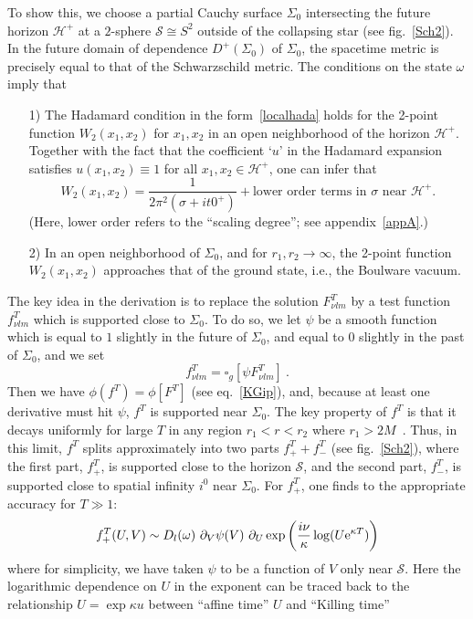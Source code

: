 \documentclass[12pt]{article}
\renewcommand{\H}{\mathcal{H}}
\newcommand{\e}{{\rm e}}
\theoremstyle{plain}
\theoremstyle{definition}
\def\ben{\begin{equation}}
\def\een{\end{equation}}
\begin{document}
To show this, we choose a partial Cauchy surface $\Sigma_0$
intersecting the future horizon $\H^+$ at a $2$-sphere ${\mathscr S} \cong S^2$ outside of the collapsing star (see
fig.~\ref{Sch2}). In the future
domain of dependence $D^+(\Sigma_0)$ of $\Sigma_0$,
the spacetime metric is precisely equal to that of
the Schwarzschild metric. The conditions on the state $\omega$ imply that
\begin{enumerate}
\item[1)] The Hadamard condition in the form~\eqref{localhada} holds for the 2-point function
$W_2(x_1,x_2)$ for $x_1,x_2$ in an open neighborhood of the horizon $\H^+$. Together with the fact that the
coefficient `$u$' in the Hadamard expansion satisfies $u(x_1,x_2) \equiv 1$ for all $x_1,x_2 \in \H^+$, one can infer that
\ben\label{hadamf}
W_2(x_1, x_2)  = \frac{1}{2\pi^2 (\sigma + it0^+)} + \text{lower order terms in $\sigma$ near $\H^+$.}
\een
(Here, lower order refers to the ``scaling degree''; see appendix~\ref{appA}.)

\item[2)] In an open neighborhood of $\Sigma_0$, and for $r_1, r_2 \to \infty$, the
2-point function $W_2(x_1,x_2)$ approaches that of the ground state, i.e., the Boulware vacuum.
\end{enumerate}
The key idea in the derivation
is to replace the solution $F^T_{\nu lm}$ by a test function $f^T_{\nu lm}$
which is supported close to $\Sigma_0$. To do so, we let
$\psi$ be a smooth function which
is equal to $1$ slightly in the future of $\Sigma_0$, and equal to $0$ slightly in the
past of $\Sigma_0$, and we set
\ben
f^T_{\nu lm} = \square_g [\psi F^T_{\nu lm} ] \ .
\een
Then we have $\phi(f^T) = \phi[F^T]$ (see eq.~\eqref{KGip}), and, because at least one derivative must hit $\psi$, $f^T$ is supported near $\Sigma_0$. 
The key property of $f^T$ is that it decays uniformly for large $T$ in any region $r_1 < r < r_2$ where $r_1 > 2M$~\cite{dafermos}.
Thus, in this limit, $f^T$ splits approximately into two parts $f_+^T+f_-^T$ (see fig.~\ref{Sch2}), where the first part, $f_+^T$, is supported close to the horizon $\mathscr S$, and the
second part, $f_-^T$, is supported close to spatial infinity $i^0$ near $\Sigma_0$.
For $f_+^T$, one finds to the appropriate accuracy
for $T \gg 1$:
\ben\label{Fp}
f^T_+(U,V) \sim  D_l(\omega) \ \partial_V
\psi(V)
 \ \partial_U \exp\left( \frac{i\nu}{\kappa} \log(U\e^{\kappa T}) \right)
\een
where for simplicity, we have taken $\psi$ to be a function of $V$ only near $\mathscr S$. Here the logarithmic
dependence on $U$ in the exponent can be traced back to the relationship $U = \exp{\kappa u}$ between ``affine time'' $U$ and ``Killing time''
\end{document}
